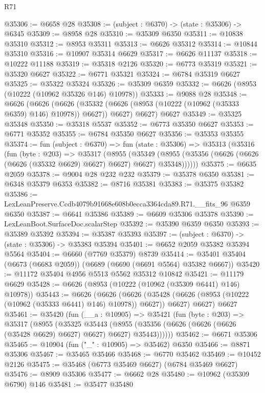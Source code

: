 \begin{lexlean}{R71}
\begin{coremodule}
@35306 := @6658 @28
@35308 := (subject : @6370) -> (state : @35306) -> @6345
@35309 := @8958 @28
@35310 := @35309 @6350
@35311 := @10838 @35310
@35312 := @8953 @35311
@35313 := @6626 @35312
@35314 := @10844 @35310
@35316 := @10907 @35314 @6629
@35317 := @6626 @11137
@35318 := @10222 @11188
@35319 := @35318 @2126
@35320 := @6773 @35319
@35321 := @35320 @6627
@35322 := @6771 @35321
@35324 := @6784 @35319 @6627
@35325 := @35322 @35324
@35326 := @35309 @6359
@35332 := @6626 (@8953 (@10222 (@10962 @35326 @146) @10978))
@35333 := @9088 @28
@35348 := @6626
    (@6626
      (@6626 (@35332 (@6626 (@8953 (@10222 (@10962 (@35333 @6359) @146) @10978)) @6627)) @6627)
      @6627)
    @6627
@35349 := @35325 @35348
@35350 := @35318 @5537
@35352 := @6773 @35350 @6627
@35353 := @6771 @35352
@35355 := @6784 @35350 @6627
@35356 := @35353 @35355
@35374 := fun (subject : @6370) =>
  fun (state : @35306) =>
  @35313
    (@35316
      (fun (byte : @203) =>
      @35317
        (@8955
          (@35349
            (@8955 (@35356 (@6626 (@6626 (@6626 (@35332 @6629) @6627) @6627) @6627) @35348))))))
@35375 := @6635 @2059
@35378 := @9004 @28 @232 @232
@35379 := @35378 @6350
@35381 := @6348 @35379 @6353
@35382 := @8716 @35381
@35383 := @35375 @35382
@35386 := LexLeanPreserve.Ccdb4079b91668e608b0ecca3364cda89.R71.__fits_96 @6359 @6350
@35387 := @6641 @35386
@35389 := @6609 @35306 @35378
@35390 := LexLeanBoot.SurfaceDoc.scalarStep
@35392 := @35390 @6359 @6350
@35393 := @35389 @35392
@35394 := @35387 @35393
@35397 := (subject : @6370) -> (state : @35306) -> @35383 @35394
@35401 := @6652 @2059 @35382 @35394 @5564
@35404 := @6660 (@7769 @35379) @8739
@35414 := @35401 @35404 (@6673 (@6683 @2059)) (@6689 (@6690 (@6691 @5564) @35382 @6667))
@35420 := @11172 @35404 @4956 @5513 @5562 @35312 @10842
@35421 := @11179 @6629
@35428 := @6626 (@8953 (@10222 (@10962 (@35309 @6441) @146) @10978))
@35443 := @6626
    (@6626
      (@6626 (@35428 (@6626 (@8953 (@10222 (@10962 (@35333 @6441) @146) @10978)) @6627)) @6627)
      @6627)
    @6627
@35461 := @35420
    (fun (__a : @10905) =>
    @35421
      (fun (byte : @203) =>
      @35317
        (@8955
          (@35325
            @35443
            (@8955 (@35356 (@6626 (@6626 (@6626 (@35428 @6629) @6627) @6627) @6627) @35443))))))
@35462 := @6671 @35306
@35465 := @10904 (fun ("_" : @10905) => @35462) @6350
@35466 := @8871 @35306
@35467 := @35465 @35466
@35468 := @6770 @35462
@35469 := @10452 @2126
@35475 := @35468 (@6773 @35469 @6627) (@6784 @35469 @6627)
@35476 := @8909 @35306
@35477 := @6662 @28
@35480 := @10962 (@35309 @6790) @146
@35481 := @35477 @35480

\end{coremodule}
\end{lexlean}
